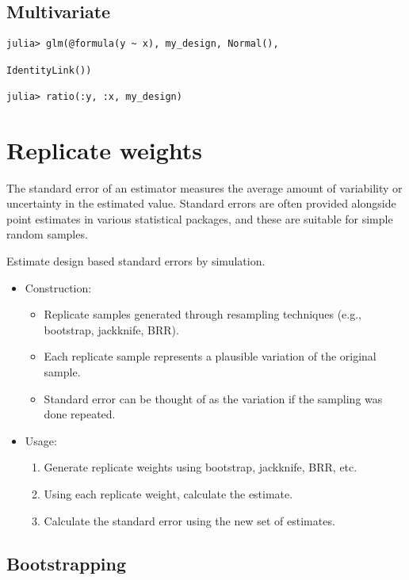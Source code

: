 \documentclass{juliacon}
\begin{document}
\subsection{Multivariate}
\begin{lstlisting}
julia> glm(@formula(y ~ x), my_design, Normal(),

IdentityLink())

julia> ratio(:y, :x, my_design)
\end{lstlisting}


\section{Replicate weights}

The standard error of an estimator measures the average amount of variability or uncertainty in the estimated value. Standard errors are often provided alongside point estimates in various statistical packages, and these are suitable for simple random samples.

Estimate design based standard errors by simulation. 
    \begin{itemize}
        \item Construction:
            \begin{itemize}
                \item Replicate samples generated through resampling techniques (e.g., bootstrap, jackknife, BRR).
                \item Each replicate sample represents a plausible variation of the original sample.
                \item Standard error can be thought of as the variation if the sampling was done repeated. 
            \end{itemize}
        \item Usage:
            \begin{enumerate}
                \item Generate replicate weights using bootstrap, jackknife, BRR, etc. 
                \item Using each replicate weight, calculate the estimate. 
                \item Calculate the standard error using the new set of estimates. 
            \end{enumerate}
        \end{itemize}


\subsection{Bootstrapping}
\end{document}
